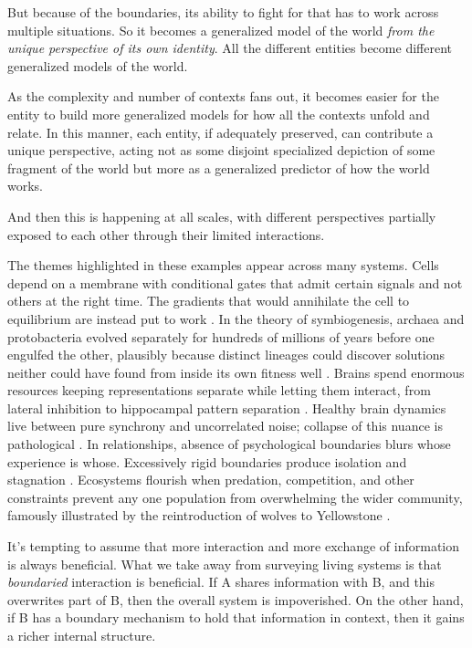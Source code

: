 \documentclass[11pt]{article}
\begin{document}
But because of the boundaries, its ability to fight for that has to work across multiple situations. So it becomes a generalized model of the world \textit{from the unique perspective of its own identity}. All the different entities become different generalized models of the world. 

As the complexity and number of contexts fans out, it becomes easier for the entity to build more generalized models for how all the contexts unfold and relate. In this manner, each entity, if adequately preserved, can contribute a unique perspective, acting not as some disjoint specialized depiction of some fragment of the world but more as a generalized predictor of how the world works.

And then this is happening at all scales, with different perspectives partially exposed to each other through their limited interactions. 


The themes highlighted in these examples appear across many systems. Cells depend on a membrane with conditional gates that admit certain signals and not others at the right time. The gradients that would annihilate the cell to equilibrium are instead put to work \citep{alberts2022molecular}. In the theory of symbiogenesis, archaea and protobacteria evolved separately for hundreds of millions of years before one engulfed the other, plausibly because distinct lineages could discover solutions neither could have found from inside its own fitness well \citep{margulis1995what, lane2010energetics}. Brains spend enormous resources keeping representations separate while letting them interact, from lateral inhibition to hippocampal pattern separation \citep{kurth2023replay}. Healthy brain dynamics live between pure synchrony and uncorrelated noise; collapse of this nuance is pathological \citep{beggs2003neuronal, hammond2007pathological}. In relationships, absence of psychological boundaries blurs whose experience is whose. Excessively rigid boundaries produce isolation and stagnation \citep{gabbard1995boundaries, perls1951gestalt, minuchin1974families}. Ecosystems flourish when predation, competition, and other constraints prevent any one population from overwhelming the wider community, famously illustrated by the reintroduction of wolves to Yellowstone \citep{ripple2012trophic}.

It's tempting to assume that more interaction and more exchange of information is always beneficial. What we take away from surveying living systems is that \textit{boundaried} interaction is beneficial. If A shares information with B, and this overwrites part of B, then the overall system is impoverished. On the other hand, if B has a boundary mechanism to hold that information in context, then it gains a richer internal structure. 
\end{document}
